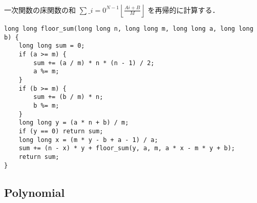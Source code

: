 \begin{small}
一次関数の床関数の和 $\sum\_{i=0}^{N-1} \left\lfloor \frac{Ai + B}{M} \right\rfloor$ を再帰的に計算する．
\end{small}

\begin{lstlisting}
long long floor_sum(long long n, long long m, long long a, long long b) {
    long long sum = 0;
    if (a >= m) {
        sum += (a / m) * n * (n - 1) / 2;
        a %= m;
    }
    if (b >= m) {
        sum += (b / m) * n;
        b %= m;
    }
    long long y = (a * n + b) / m;
    if (y == 0) return sum;
    long long x = (m * y - b + a - 1) / a;
    sum += (n - x) * y + floor_sum(y, a, m, a * x - m * y + b);
    return sum;
}
\end{lstlisting}


\subsection{Polynomial}


